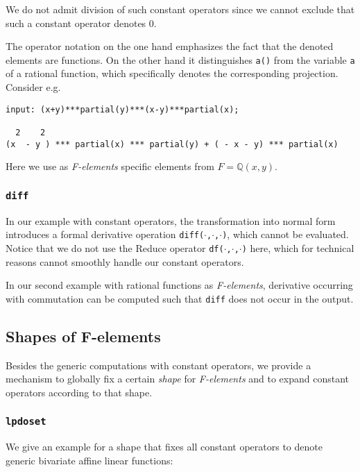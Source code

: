 \begin{center}
  \begin{ebnf}
  \end{ebnf}
\end{center}
We do not admit division of such constant operators since we cannot
exclude that such a constant operator denotes $0$.

The operator notation on the one hand emphasizes the fact that the
denoted elements are functions. On the other hand it distinguishes
\texttt{a()} from the variable \texttt{a} of a rational function,
which specifically denotes the corresponding projection. Consider e.g.

\begin{footnotesize}
\begin{verbatim}
input: (x+y)***partial(y)***(x-y)***partial(x);

  2    2
(x  - y ) *** partial(x) *** partial(y) + ( - x - y) *** partial(x)
\end{verbatim}
\end{footnotesize}
Here we use as \textit{F-elements} specific elements from $F=\mathbb{Q}(x,y)$.

\subsubsection{\texttt{diff}}
In our example with constant operators, the transformation into normal
form introduces a formal derivative operation
\texttt{diff($\cdot$,$\cdot$,$\cdot$)}, which cannot be evaluated.
Notice that we do not use the Reduce operator
\texttt{df($\cdot$,$\cdot$,$\cdot$)} here, which for technical reasons
cannot smoothly handle our constant operators.

In our second example with rational functions as \textit{F-elements},
derivative occurring with commutation can be computed such that
\texttt{diff} does not occur in the output.

\subsection{Shapes of F-elements}
Besides the generic computations with constant operators, we provide a
mechanism to globally fix a certain \emph{shape} for
\textit{F-elements} and to expand constant operators according to that
shape.
\subsubsection{\texttt{lpdoset}}
We give an example for a shape that fixes all constant operators to
denote generic bivariate affine linear functions:

